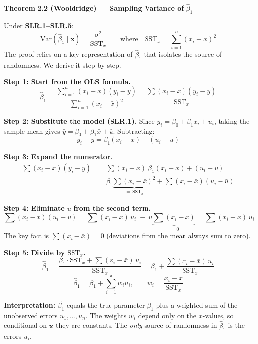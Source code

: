 \documentclass[11pt,a4paper]{article}
\begin{document}
\begin{bookexample}
\textbf{\color{blockcolor}Theorem 2.2 (Wooldridge) --- Sampling Variance of $\hat{\beta}_1$}

\medskip
Under \textbf{SLR.1--SLR.5}:
\[
  \boxed{\text{Var}(\hat{\beta}_1 \mid \mathbf{x}) = \frac{\sigma^2}{\text{SST}_x}}
  \qquad\text{where}\quad
  \text{SST}_x = \sum_{i=1}^{n}(x_i - \bar{x})^2
\]
The proof relies on a key representation of $\hat{\beta}_1$ that isolates the source of randomness. We derive it step by step.

\medskip
\textbf{Step 1: Start from the OLS formula.}
\[
  \hat{\beta}_1 = \frac{\sum_{i=1}^{n}(x_i - \bar{x})(y_i - \bar{y})}{\sum_{i=1}^{n}(x_i - \bar{x})^2}
  = \frac{\sum(x_i - \bar{x})(y_i - \bar{y})}{\text{SST}_x}
\]

\textbf{Step 2: Substitute the model (\textbf{SLR.1}).} Since $y_i = \beta_0 + \beta_1 x_i + u_i$, taking the sample mean gives $\bar{y} = \beta_0 + \beta_1 \bar{x} + \bar{u}$. Subtracting:
\[
  y_i - \bar{y} = \beta_1(x_i - \bar{x}) + (u_i - \bar{u})
\]

\textbf{Step 3: Expand the numerator.}
\begin{align*}
  \sum(x_i - \bar{x})(y_i - \bar{y})
  &= \sum(x_i - \bar{x})\bigl[\beta_1(x_i - \bar{x}) + (u_i - \bar{u})\bigr] \\
  &= \beta_1 \underbrace{\sum(x_i - \bar{x})^2}_{= \,\text{SST}_x} + \sum(x_i - \bar{x})(u_i - \bar{u})
\end{align*}

\textbf{Step 4: Eliminate $\bar{u}$ from the second term.}
\[
  \sum(x_i - \bar{x})(u_i - \bar{u})
  = \sum(x_i - \bar{x})\,u_i \;-\; \bar{u}\underbrace{\sum(x_i - \bar{x})}_{= \,0}
  = \sum(x_i - \bar{x})\,u_i
\]
The key fact is $\sum(x_i - \bar{x}) = 0$ (deviations from the mean always sum to zero).

\textbf{Step 5: Divide by $\text{SST}_x$.}
\[
  \hat{\beta}_1
  = \frac{\beta_1 \cdot \text{SST}_x + \sum(x_i - \bar{x})\,u_i}{\text{SST}_x}
  = \beta_1 + \frac{\sum(x_i - \bar{x})\,u_i}{\text{SST}_x}
\]
\[
  \boxed{\hat{\beta}_1 = \beta_1 + \sum_{i=1}^{n} w_i u_i,
  \qquad w_i = \frac{x_i - \bar{x}}{\text{SST}_x}}
\]

\textbf{Interpretation:} $\hat{\beta}_1$ equals the true parameter $\beta_1$ plus a weighted sum of the unobserved errors $u_1, \ldots, u_n$. The weights $w_i$ depend only on the $x$-values, so conditional on $\mathbf{x}$ they are constants. The \emph{only} source of randomness in $\hat{\beta}_1$ is the errors $u_i$.
\end{bookexample}
\end{document}
